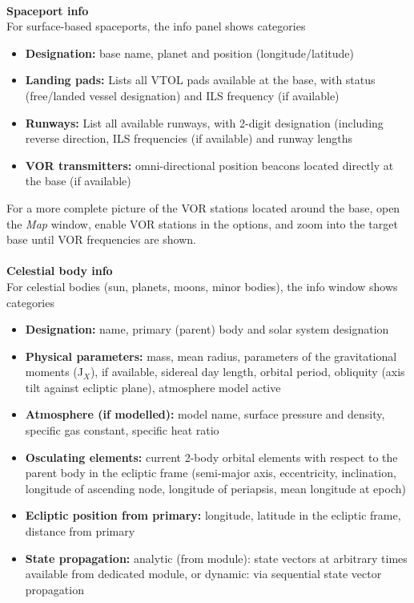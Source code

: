 \documentclass[Orbiter User Manual.tex]{subfiles}
\begin{document}
\noindent
\\
\textbf{Spaceport info}\\
For surface-based spaceports, the info panel shows categories

\begin{figure}[H]
	\centering
\end{figure}

\noindent
\begin{itemize}
\item \textbf{Designation:} base name, planet and position (longitude/latitude)
\item \textbf{Landing pads:} Lists all VTOL pads available at the base, with status (free/landed vessel designation) and ILS frequency (if available)
\item \textbf{Runways:} List all available runways, with 2-digit designation (including reverse direction, ILS frequencies (if available) and runway lengths
\item \textbf{VOR transmitters:} omni-directional position beacons located directly at the base (if available)
\end{itemize}

\noindent
For a more complete picture of the VOR stations located around the base, open the \textit{Map} window, enable VOR stations in the options, and zoom into the target base until VOR frequencies are shown.\\
\\
\textbf{Celestial body info}\\
For celestial bodies (sun, planets, moons, minor bodies), the info window shows categories

\begin{figure}[H]
	\centering
\end{figure}

\noindent
\begin{itemize}
\item \textbf{Designation:} name, primary (parent) body and solar system designation
\item \textbf{Physical parameters:} mass, mean radius, parameters of the gravitational moments (J$_{X}$), if available, sidereal day length, orbital period, obliquity (axis tilt against ecliptic plane), atmosphere model active
\item \textbf{Atmosphere (if modelled):} model name, surface pressure and density, specific gas constant, specific heat ratio
\item \textbf{Osculating elements:} current 2-body orbital elements with respect to the parent body in the ecliptic frame (semi-major axis, eccentricity, inclination, longitude of ascending node, longitude of periapsis, mean longitude at epoch)
\item \textbf{Ecliptic position from primary:} longitude, latitude in the ecliptic frame, distance from primary
\item \textbf{State propagation:} analytic (from module): state vectors at arbitrary times available from dedicated module, or dynamic: via sequential state vector propagation
\end{itemize}
\end{document}
